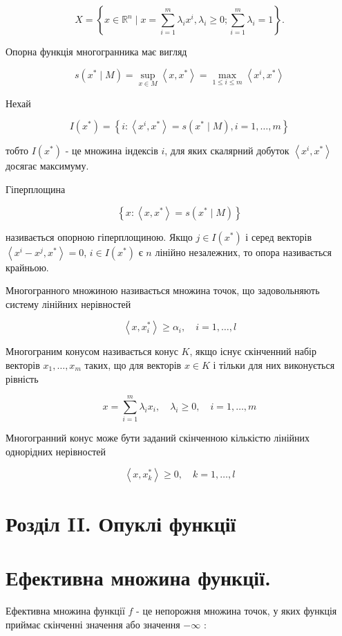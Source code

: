 \documentclass[10pt]{article}
\begin{document}
$$
X=\left\{x \in \mathbb{R}^{n} \mid x=\sum_{i=1}^{m} \lambda_{i} x^{i}, \lambda_{i} \geq 0 ; \sum_{i=1}^{m} \lambda_{i}=1\right\} .
$$

Опорна функція многогранника має вигляд

$$
s\left(x^{*} \mid M\right)=\sup _{x \in M}\left\langle x, x^{*}\right\rangle=\max _{1 \leq i \leq m}\left\langle x^{i}, x^{*}\right\rangle
$$

Нехай

$$
I\left(x^{*}\right)=\left\{i:\left\langle x^{i}, x^{*}\right\rangle=s\left(x^{*} \mid M\right), i=1, \ldots, m\right\}
$$

тобто $I\left(x^{*}\right)$ - це множина індексів $i$, для яких скалярний добуток $\left\langle x^{i}, x^{*}\right\rangle$ досягає максимуму.

Гіперплощина

$$
\left\{x:\left\langle x, x^{*}\right\rangle=s\left(x^{*} \mid M\right)\right\}
$$

називається опорною гіперплощиною. Якщо $j \in I\left(x^{*}\right)$ і серед векторів $\left\langle x^{i}-x^{j}, x^{*}\right\rangle=0$, $i \in I\left(x^{*}\right)$ є $n$ лінійно незалежних, то опора називається крайньою.

Многогранного множиною називається множина точок, що задовольняють систему лінійних нерівностей

$$
\left\langle x, x_{i}^{*}\right\rangle \geq \alpha_{i}, \quad i=1, \ldots, l
$$

Многограним конусом називається конус $K$, якщо існує скінченний набір векторів $x_{1}, \ldots, x_{m}$ таких, що для векторів $x \in K$ і тільки для них виконується рівність

$$
x=\sum_{i=1}^{m} \lambda_{i} x_{i}, \quad \lambda_{i} \geq 0, \quad i=1, \ldots, m
$$

Многогранний конус може бути заданий скінченною кількістю лінійних однорідних нерівностей

$$
\left\langle x, x_{k}^{*}\right\rangle \geq 0, \quad k=1, \ldots, l
$$

\section*{Розділ II. Опуклі функції}
\section*{Ефективна множина функції.}
Ефективна множина функції $f$ - це непорожня множина точок, у яких функція приймає скінченні значення або значення $-\infty$ :
\end{document}
